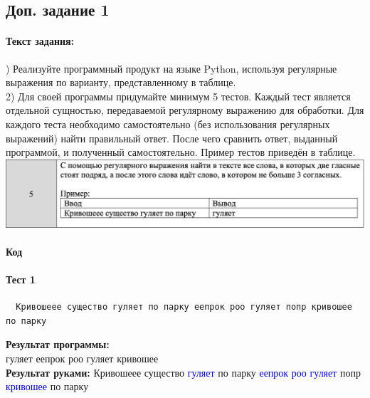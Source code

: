 \documentclass[12pt,onecolumn]{article}
\begin{document}
\begin{flushleft}
\subsection{Доп. задание 1}
\paragraph{Текст задания:}
\hfill {}) Реализуйте программный продукт на языке Python, используя регулярные выражения по варианту, представленному в таблице.\\
2) Для своей программы придумайте минимум 5 тестов. Каждый тест является отдельной сущностью, передаваемой регулярному выражению для обработки. Для каждого теста необходимо самостоятельно (без использования регулярных выражений) найти правильный ответ. После чего сравнить ответ, выданный программой, и полученный самостоятельно.
Пример тестов приведён в таблице.
\includegraphics[scale=0.5]{images/no2.png}
\paragraph{Код}
\hfill \break
\FloatBarrier

\paragraph{Тест 1}
\begin{verbatim}
  Кривошеее существо гуляет по парку еепрок роо гуляет попр кривошее по парку
\end{verbatim}
\textbf{Результат программы:}\\
гуляет еепрок роо гуляет кривошее\\
\textbf{Результат руками:}
\newline Кривошеее существо \textcolor{blue}{гуляет} по парку \textcolor{blue}{еепрок} \textcolor{blue}{роо} \textcolor{blue}{гуляет} попр \textcolor{blue}{кривошее} по парку

\end{flushleft}
\end{document}
